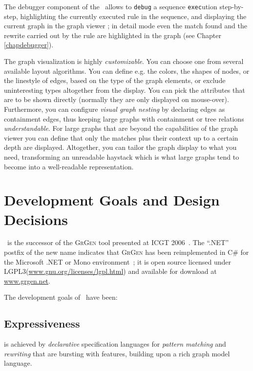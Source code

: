 The debugger component of the \GrShell\ allows to \texttt{debug} a sequence \texttt{exec}ution step-by-step, highlighting the currently executed rule in the sequence, and displaying the current graph in the graph viewer \yComp;
in detail mode even the match found and the rewrite carried out by the rule are highlighted in the graph (see Chapter \ref{chapdebugger}).

The graph visualization is highly \emph{customizable}.
You can choose one from several available layout algorithms.
You can define e.g. the colors, the shapes of nodes, or the linestyle of edges, based on the type of the graph elements,
or exclude uninteresting types altogether from the display.
You can pick the attributes that are to be shown directly (normally they are only displayed on mouse-over).
Furthermore, you can configure \emph{visual graph nesting} by declaring edges as containment edges, thus keeping large graphs with containment or tree relations \emph{understandable}.
For large graphs that are beyond the capabilities of the graph viewer you can define that only the matches plus their context up to a certain depth are displayed.
Altogether, you can tailor the graph display to what you need, transforming an unreadable haystack which is what large graphs tend to become into a well-readable representation.


\section{Development Goals and Design Decisions}

\GrG~is the successor of the \textsc{GrGen} tool presented at ICGT 2006~\cite{GBGHS:06}.
The ``.NET'' postfix of the new name indicates that \textsc{GrGen} has been reimplemented in C\# for the Microsoft .NET or Mono environment~\cite{NET,MONO};
it is open source licensed under LGPL3(\url{www.gnu.org/licenses/lgpl.html}) and available for download at \url{www.grgen.net}.

The development goals of \GrG\ have been:

\subsection*{Expressiveness}
is achieved by \emph{declarative} specification languages for \emph{pattern matching} and \emph{rewriting} that are bursting with features, building upon a rich graph model language.

